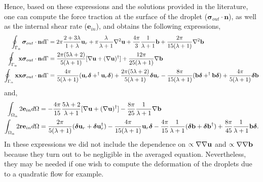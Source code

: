 Hence, based on these expressions and the solutions  provided in the literature, one can compute the force traction at the surface of the droplet ($\bm\sigma_{out}\cdot \textbf{n}$), as well as the internal shear rate ($\textbf{e}_{in}$), and obtains the following expressions, 
\begin{align}
    \oint_{\Gamma_{\alpha}} \bm\sigma_{out}\cdot \textbf{n} d\Gamma &
    =
    2\pi\frac{2+3\lambda}{1+\lambda}\textbf{u}_r
    + \pi \frac{\lambda}{\lambda +1} \mathbf{\nabla}^2 \textbf{u}
    +
    \frac{4\pi}{3}\frac{1}{\lambda +1}\textbf{b}
    + \frac{2\pi}{15(\lambda +1)}\mathbf{\nabla}^2\textbf{b}
    \\
    \oint_{\Gamma_{\alpha}}  \textbf{x}\bm\sigma_{out}\cdot \textbf{n} d\Gamma &
    =
    \frac{2\pi(5\lambda +2)}{5(\lambda +1)}[\mathbf{\nabla} \textbf{u}+ (\mathbf{\nabla} \textbf{u})^\dagger]
    + \frac{12\pi}{25(\lambda +1)} \mathbf{\nabla} \textbf{b} 
    \\
    \oint_{\Gamma_{\alpha}} \textbf{xx}\bm\sigma_{out}\cdot \textbf{n} d\Gamma &
    =
    \frac{4\pi}{5(\lambda +1)} (\textbf{u}_r \bm\delta + ^\dagger\textbf{u}_r \bm\delta)
    + \frac{2\pi(5\lambda +2)}{5(\lambda+1)}\bm\delta \textbf{u}_r
    - \frac{8\pi}{15(\lambda +1)} ( \textbf{b}\bm\delta + ^\dagger\textbf{b}\bm\delta )
    + \frac{4\pi}{5(\lambda+1)}\bm\delta \textbf{b}
\end{align}
and, 
\begin{align}
    \int_{\Omega_{\alpha}} 2\textbf{e}_{in} d\Omega
    &=
    -\frac{4\pi}{15}\frac{5\lambda +2}{\lambda+1}
    [\mathbf{\nabla} \textbf{u}+ (\mathbf{\nabla} \textbf{u})^\dagger]
    - \frac{8\pi}{25}\frac{1}{\lambda+1}
    \mathbf{\nabla}\textbf{b}
    \\
    \int_{\Omega_{\alpha}} 2\textbf{r}\textbf{e}_{in} d\Omega
    &=
    \frac{2\pi}{5(\lambda+1)}
    (\bm\delta \textbf{u}_r +  \bm\delta\textbf{u}_r^\dagger)
    -\frac{4\pi}{15(\lambda+1)}\textbf{u}_r\bm\delta 
    -\frac{4\pi}{15}\frac{1}{\lambda+1}
    (\bm\delta \textbf{b} +  \bm\delta\textbf{b}^\dagger)
    +\frac{8\pi}{45}\frac{1}{\lambda+1}
    \textbf{b}\bm\delta. 
\end{align}
In these expressions we did not include the dependence on $\propto \mathbf{\nabla}\mathbf{\nabla} \textbf{u}$ and $\propto \mathbf{\nabla}\mathbf{\nabla} \textbf{b}$ because they turn out to be negligible in the averaged equation. 
Nevertheless, they may be needed if one wish to compute the deformation of the droplets due to a quadratic flow for example. %


